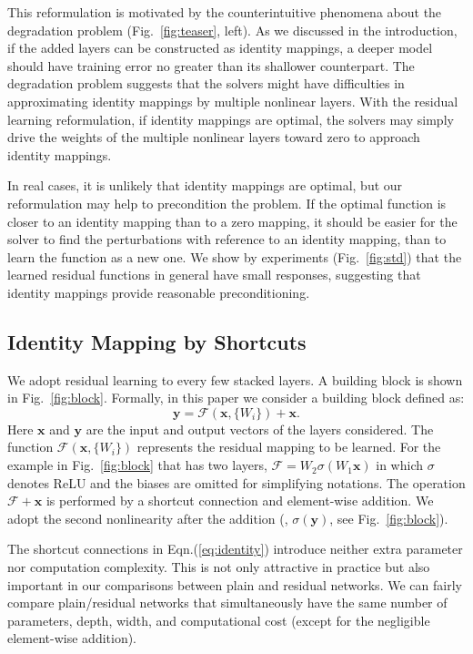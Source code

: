 \documentclass[10pt,twocolumn,letterpaper]{article}
\newcommand{\ve}[1]{\mathbf{#1}} %
\begin{document}
This reformulation is motivated by the counterintuitive phenomena about the degradation problem (Fig.~\ref{fig:teaser}, left). As we discussed in the introduction, if the added layers can be constructed as identity mappings, a deeper model should have training error no greater than its shallower counterpart. The degradation problem suggests that the solvers might have difficulties in approximating identity mappings by multiple nonlinear layers. With the residual learning reformulation, if identity mappings are optimal, the solvers may simply drive the weights of the multiple nonlinear layers toward zero to approach identity mappings.

In real cases, it is unlikely that identity mappings are optimal, but our reformulation may help to precondition the problem. If the optimal function is closer to an identity mapping than to a zero mapping, it should be easier for the solver to find the perturbations with reference to an identity mapping, than to learn the function as a new one. We show by experiments (Fig.~\ref{fig:std}) that the learned residual functions in general have small responses, suggesting that identity mappings provide reasonable preconditioning.

\subsection{Identity Mapping by Shortcuts}

We adopt residual learning to every few stacked layers.
A building block is shown in Fig.~\ref{fig:block}. Formally, in this paper we consider a building block defined as:
\begin{equation}\label{eq:identity}
  \ve{y}= \mathcal{F}(\ve{x}, \{W_{i}\}) + \ve{x}.
\end{equation}
Here $\ve{x}$ and $\ve{y}$ are the input and output vectors of the layers considered. The function $\mathcal{F}(\ve{x}, \{W_{i}\})$ represents the residual mapping to be learned. For the example in Fig.~\ref{fig:block} that has two layers, $\mathcal{F}=W_{2}\sigma(W_{1}\ve{x})$ in which $\sigma$ denotes ReLU \cite{Nair2010} and the biases are omitted for simplifying notations. The operation $\mathcal{F}+\ve{x}$ is performed by a shortcut connection and element-wise addition. We adopt the second nonlinearity after the addition (\ie, $\sigma(\ve{y})$, see Fig.~\ref{fig:block}).

The shortcut connections in Eqn.(\ref{eq:identity}) introduce neither extra parameter nor computation complexity. This is not only attractive in practice but also important in our comparisons between plain and residual networks. We can fairly compare plain/residual networks that simultaneously have the same number of parameters, depth, width, and computational cost (except for the negligible element-wise addition).
\end{document}
